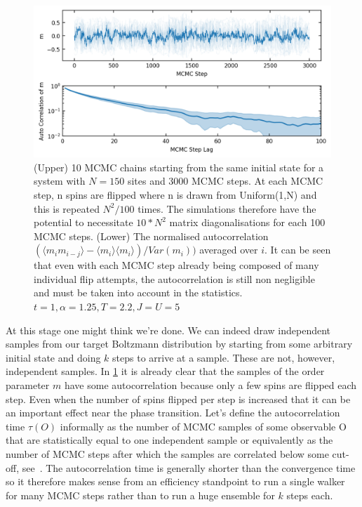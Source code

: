 \hypertarget{fig:m_autocorr}{%
\begin{figure}
\centering
\includegraphics[width=1\textwidth,height=\textheight]{figure_code/fk_chapter/lsr/figs/m_autocorr.png}
\caption[{Autocorrelation in MCMC}]{(Upper) 10 MCMC chains starting from the same initial state for a system with \(N = 150\) sites and 3000 MCMC steps. At each MCMC step, n spins are flipped where n is drawn from Uniform(1,N) and this is repeated \(N^2/100\) times. The simulations therefore have the potential to necessitate \(10*N^2\) matrix diagonalisations for each 100 MCMC steps. (Lower) The normalised autocorrelation \((\langle m_i m_{i-j}\rangle - \langle m_i\rangle \langle m_i \rangle) / Var(m_i))\) averaged over \(i\). It can be seen that even with each MCMC step already being composed of many individual flip attempts, the autocorrelation is still non negligible and must be taken into account in the statistics. \(t = 1, \alpha = 1.25, T = 2.2, J = U = 5\)}
\label{fig:m_autocorr}
\end{figure}
}

At this stage one might think we're done. We can indeed draw independent samples from our target Boltzmann distribution by starting from some arbitrary initial state and doing \(k\) steps to arrive at a sample. These are not, however, independent samples. In \cref{fig:m_autocorr} it is already clear that the samples of the order parameter \(m\) have some autocorrelation because only a few spins are flipped each step. Even when the number of spins flipped per step is increased that it can be an important effect near the phase transition. Let's define the autocorrelation time \(\tau(O)\) informally as the number of MCMC samples of some observable O that are statistically equal to one independent sample or equivalently as the number of MCMC steps after which the samples are correlated below some cut-off, see~\autocite{krauthIntroductionMonteCarlo1996}. The autocorrelation time is generally shorter than the convergence time so it therefore makes sense from an efficiency standpoint to run a single walker for many MCMC steps rather than to run a huge ensemble for \(k\) steps each.

